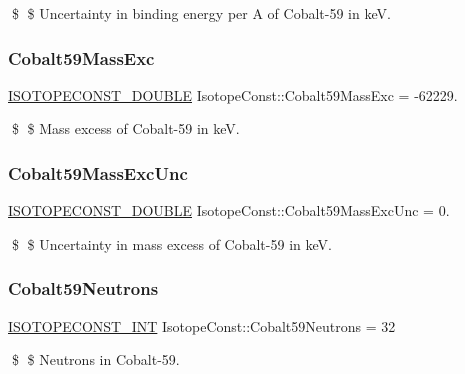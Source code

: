 \$ \$ Uncertainty in binding energy per A of Cobalt-\/59 in keV. \mbox{\label{group___isotope_const-_cobalt-_co59_ga40a483d05e28995576f5b405be63ec69}} 
\subsubsection{\texorpdfstring{Cobalt59\+Mass\+Exc}{Cobalt59MassExc}}
{\footnotesize\ttfamily \mbox{\hyperlink{group___isotope_const-_macros_ga8f45a7272ce02c0b4c65c44636ed719a}{I\+S\+O\+T\+O\+P\+E\+C\+O\+N\+S\+T\+\_\+\+D\+O\+U\+B\+LE}} Isotope\+Const\+::\+Cobalt59\+Mass\+Exc = -\/62229.}

\$ \$ Mass excess of Cobalt-\/59 in keV. \mbox{\label{group___isotope_const-_cobalt-_co59_ga58c2525daaaa72c654ecf8f514687ece}} 
\subsubsection{\texorpdfstring{Cobalt59\+Mass\+Exc\+Unc}{Cobalt59MassExcUnc}}
{\footnotesize\ttfamily \mbox{\hyperlink{group___isotope_const-_macros_ga8f45a7272ce02c0b4c65c44636ed719a}{I\+S\+O\+T\+O\+P\+E\+C\+O\+N\+S\+T\+\_\+\+D\+O\+U\+B\+LE}} Isotope\+Const\+::\+Cobalt59\+Mass\+Exc\+Unc = 0.}

\$ \$ Uncertainty in mass excess of Cobalt-\/59 in keV. \mbox{\label{group___isotope_const-_cobalt-_co59_ga719832f7b0f1c7b54acd03bea2b80f4e}} 
\subsubsection{\texorpdfstring{Cobalt59\+Neutrons}{Cobalt59Neutrons}}
{\footnotesize\ttfamily \mbox{\hyperlink{group___isotope_const-_macros_ga5f18360b3e99483a35c32d789e62621c}{I\+S\+O\+T\+O\+P\+E\+C\+O\+N\+S\+T\+\_\+\+I\+NT}} Isotope\+Const\+::\+Cobalt59\+Neutrons = 32}

\$ \$ Neutrons in Cobalt-\/59. \mbox{\label{group___isotope_const-_cobalt-_co59_ga0bcd3e47b5faf613283b0d8a0f720e92}} 
